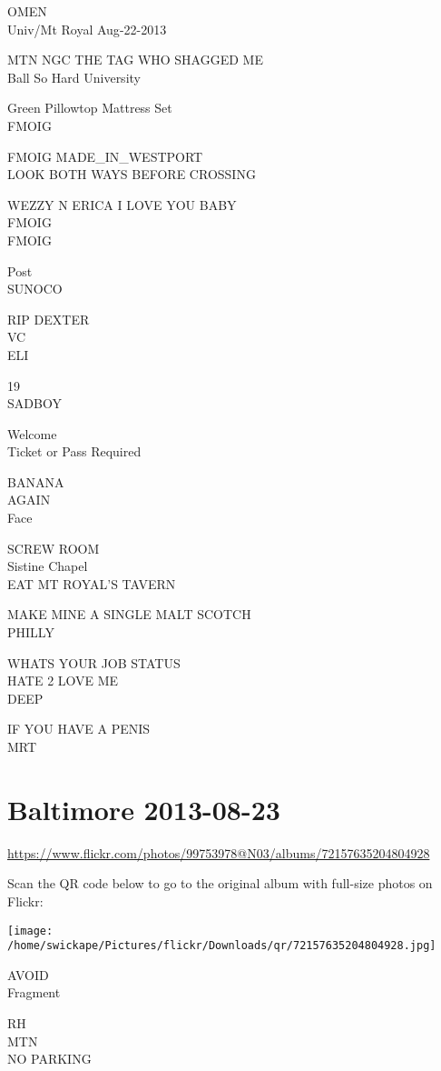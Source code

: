 \documentclass[10pt,letterpaper]{article}
\begin{document}
OMEN\\
Univ/Mt Royal Aug{-}22{-}2013

MTN NGC THE TAG WHO SHAGGED ME\\
Ball So Hard University

Green Pillowtop Mattress Set\\
FMOIG

FMOIG MADE\_IN\_WESTPORT\\
LOOK BOTH WAYS BEFORE CROSSING

WEZZY N ERICA I LOVE YOU BABY\\
FMOIG\\
FMOIG

Post\\
SUNOCO

RIP DEXTER\\
VC\\
ELI

19\\
SADBOY

Welcome\\
Ticket or Pass Required

BANANA\\
AGAIN\\
Face

SCREW ROOM\\
Sistine Chapel\\
EAT MT ROYAL'S TAVERN

MAKE MINE A SINGLE MALT SCOTCH\\
PHILLY

WHATS YOUR JOB STATUS\\
HATE 2 LOVE ME\\
DEEP

IF YOU HAVE A PENIS\\
MRT


\section*{Baltimore 2013-08-23}

\url{https://www.flickr.com/photos/99753978@N03/albums/72157635204804928}

Scan the QR code below to go to the original album with full-size photos on Flickr:

\texttt{[image: /home/swickape/Pictures/flickr/Downloads/qr/72157635204804928.jpg]}


AVOID\\
Fragment

RH\\
MTN\\
NO PARKING
\end{document}
